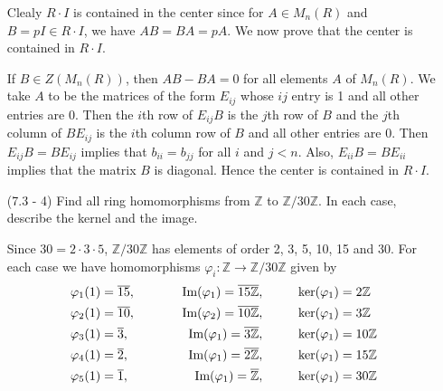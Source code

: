 \documentclass[12pt]{article}
\newcommand{\bz}{\mathbb{Z}}
\newcommand{\mz}{\mathbb{Z}}
\begin{document}
\begin{enumerate}
\begin{mybox}
    Clealy $R\cdot I$ is contained in the center since
    for $A\in M_n(R)$ and $B=pI\in R\cdot I$, we have
    $AB=BA=pA$. We now prove that the center is contained
    in $R\cdot I$.

    \vspace*{3mm}
    If $B\in Z(M_n(R))$, then $AB-BA=0$ for all elements
    $A$ of $M_n(R)$. We take $A$ to be the matrices
    of the form $E_{ij}$ whose $ij$ entry is 1 and all
    other entries are 0. Then the $i$th row of
    $E_{ij}B$ is the $j$th row of $B$ and the
    $j$th column of
    $BE_{ij}$ is the $i$th column row of $B$
    and all other entries are 0. Then $E_{ij}B
    =BE_{ij}$ implies that $b_{ii}=b_{jj}$ for all
    $i$ and $j<n$. Also, $E_{ii}B=BE_{ii}$ implies that
    the matrix $B$ is diagonal. Hence the center is
    contained in $R\cdot I$.
\end{mybox}

\item[(7.3 - 4)] Find all ring homomorphisms from
    $\bz$ to $\bz/30\bz$. In each case, describe
    the kernel and the image.
\begin{mybox}

    Since $30=2\cdot3\cdot5$, $\mz/30\mz$ has elements
    of order 2, 3, 5, 10, 15 and 30. For each case we
    have homomorphisms $\varphi_i:\mz\to\mz/30\mz$ given
    by
    \begin{align}
        &\varphi_1(1)=\overline{15},\hspace*{10mm}
        &\text{Im}(\varphi_1)=\overline{15\mz},
        \hspace*{10mm} 
        &\text{ker}(\varphi_1)=2\mz\\
        &\varphi_2(1)=\overline{10},\hspace*{10mm}
        &\text{Im}(\varphi_2)=\overline{10\mz},
        \hspace*{10mm} 
        &\text{ker}(\varphi_1)=3\mz\\
        &\varphi_3(1)=\overline{3},\hspace*{10mm}
        &\text{Im}(\varphi_1)=\overline{3\mz},
        \hspace*{10mm} 
        &\text{ker}(\varphi_1)=10\mz\\
        &\varphi_4(1)=\overline{2},\hspace*{10mm}
        &\text{Im}(\varphi_1)=\overline{2\mz},
        \hspace*{10mm} 
        &\text{ker}(\varphi_1)=15\mz\\
        &\varphi_5(1)=\overline{1},\hspace*{10mm}
        &\text{Im}(\varphi_1)=\overline{\mz},
        \hspace*{10mm} 
        &\text{ker}(\varphi_1)=30\mz
    \end{align}
\end{mybox}


\end{enumerate}
\end{document}
